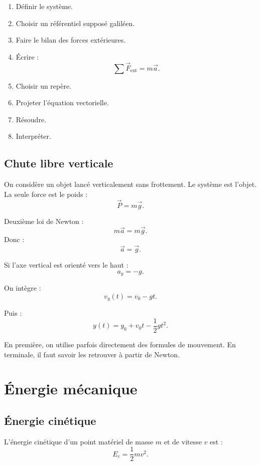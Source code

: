 \documentclass[11pt,a4paper]{article}
\begin{document}
\begin{methode}
\begin{enumerate}
  \item Définir le système.
  \item Choisir un référentiel supposé galiléen.
  \item Faire le bilan des forces extérieures.
  \item Écrire :
  \[
  \sum \vec F_{\text{ext}}=m\vec a.
  \]
  \item Choisir un repère.
  \item Projeter l'équation vectorielle.
  \item Résoudre.
  \item Interpréter.
\end{enumerate}
\end{methode}

\subsection{Chute libre verticale}

On considère un objet lancé verticalement sans frottement.  
Le système est l'objet.  
La seule force est le poids :
\[
\vec P=m\vec g.
\]

Deuxième loi de Newton :
\[
m\vec a=m\vec g.
\]
Donc :
\[
\vec a=\vec g.
\]

Si l'axe vertical est orienté vers le haut :
\[
a_y=-g.
\]

On intègre :
\[
v_y(t)=v_0-gt.
\]

Puis :
\[
y(t)=y_0+v_0t-\frac12gt^2.
\]

\begin{transition}
En première, on utilise parfois directement des formules de mouvement.  
En terminale, il faut savoir les retrouver à partir de Newton.
\end{transition}

\section{Énergie mécanique}

\subsection{Énergie cinétique}

\begin{definition}
L'énergie cinétique d'un point matériel de masse $m$ et de vitesse $v$ est :
\[
E_c=\frac12mv^2.
\]
\end{definition}
\end{document}
